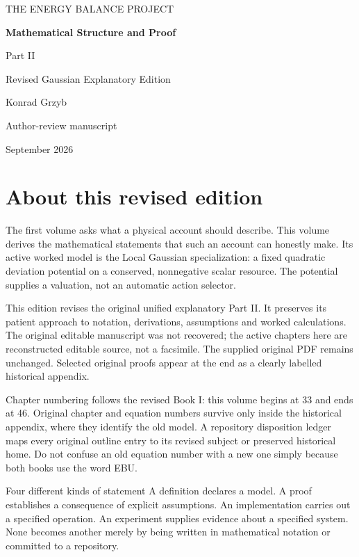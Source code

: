 \begin{titlepage}
\color{navy}\sffamily\raggedright
\vspace*{30pt}
{\large THE ENERGY BALANCE PROJECT\par}
\vspace{30pt}
{\fontsize{32}{38}\selectfont\bfseries Mathematical Structure and Proof\par}
\vspace{20pt}
{\Large Part II\par}
\vspace{12pt}
{\large Revised Gaussian Explanatory Edition\par}
\vfill
{\large Konrad Grzyb\par}
\vspace{12pt}
{\normalsize Author-review manuscript\par September 2026\par}
\end{titlepage}
\chapter*{About this revised edition}
The first volume asks what a physical account should describe. This volume
derives the mathematical statements that such an account can honestly make.
Its active worked model is the Local Gaussian specialization: a fixed
quadratic deviation potential on a conserved, nonnegative scalar resource.
The potential supplies a valuation, not an automatic action selector.

This edition revises the original unified explanatory Part II. It preserves
its patient approach to notation, derivations, assumptions and worked
calculations. The original editable manuscript was not recovered; the active
chapters here are reconstructed editable source, not a facsimile. The supplied
original PDF remains unchanged. Selected original proofs appear at the end
as a clearly labelled historical appendix.

Chapter numbering follows the revised Book I: this volume begins at 33 and
ends at 46. Original chapter and equation numbers survive only inside the
historical appendix, where they identify the old model. A repository
disposition ledger maps every original outline entry to its revised subject
or preserved historical home. Do not confuse an old equation number with a
new one simply because both books use the word EBU.

\begin{cautionbox}{Four different kinds of statement}
A definition declares a model. A proof establishes a consequence of explicit
assumptions. An implementation carries out a specified operation. An
experiment supplies evidence about a specified system. None becomes another
merely by being written in mathematical notation or committed to a repository.
\end{cautionbox}

